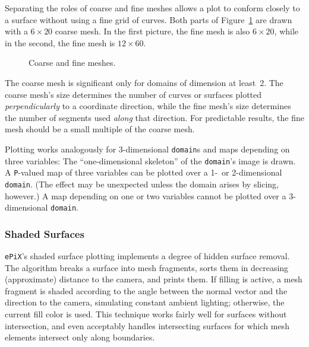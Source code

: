 \documentclass[12pt,letterpaper]{book}
\newcommand{\code}[1]{\texttt{#1}}
\newcommand{\ePiX}{\code{ePiX}}
\newcommand{\teximath}[1]{$#1$}
\begin{document}
Separating the roles of coarse and fine meshes allows a plot to
conform closely to a surface without using a fine grid of curves.
Both parts of Figure~\ref{fig-plot} are drawn with a
\teximath{6\times20} coarse mesh. In the first picture, the fine mesh
is also \teximath{6\times20}, while in the second, the fine mesh is
\teximath{12\times60}.

\begin{figure}[hbt]
  \begin{center}
    \hspace*{0.5in}
    
    \caption{Coarse and fine meshes.}
    \label{fig-plot}
  \end{center}
\end{figure}

The coarse mesh is significant only for domains of dimension at
least~2. The coarse mesh's size determines the number of curves or
surfaces plotted \emph{perpendicularly} to a coordinate direction,
while the fine mesh's size determines the number of segments used
\emph{along} that direction.  For predictable results, the fine mesh
should be a small multiple of the coarse mesh.

Plotting works analogously for 3-dimensional \code{domain}s and maps
depending on three variables: The ``one-dimensional skeleton'' of the
\code{domain}'s image is drawn.  A \code{P}-valued map of
three variables can be plotted over a 1-~or 2-dimensional
\code{domain}. (The effect may be unexpected unless the domain arises
by slicing, however.) A map depending on one or two variables cannot
be plotted over a 3-dimensional \code{domain}.


\subsubsection*{Shaded Surfaces}


\ePiX's shaded surface plotting implements a degree of hidden surface
removal. The algorithm breaks a surface into mesh fragments, sorts
them in decreasing (approximate) distance to the camera, and prints
them.  If filling is active, a mesh fragment is shaded according to
the angle between the normal vector and the direction to the camera,
simulating constant ambient lighting; otherwise, the current fill
color is used.  This technique works fairly well for surfaces without
intersection, and even acceptably handles intersecting surfaces for
which mesh elements intersect only along boundaries.
\end{document}
